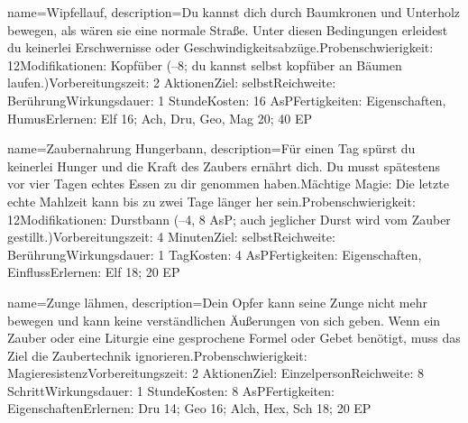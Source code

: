 {
    name={Wipfellauf},
    description={Du kannst dich durch Baumkronen und Unterholz bewegen, als wären sie eine normale Straße. Unter diesen Bedingungen erleidest du keinerlei Erschwernisse oder Geschwindigkeitsabzüge.\newline Probenschwierigkeit: 12\newline Modifikationen: Kopfüber (–8; du kannst selbst kopfüber an Bäumen laufen.)\newline Vorbereitungszeit: 2 Aktionen\newline Ziel: selbst\newline Reichweite: Berührung\newline Wirkungsdauer: 1 Stunde\newline Kosten: 16 AsP\newline Fertigkeiten: Eigenschaften, Humus\newline Erlernen: Elf 16; Ach, Dru, Geo, Mag 20; 40 EP}
}


{
    name={Zaubernahrung Hungerbann},
    description={Für einen Tag spürst du keinerlei Hunger und die Kraft des Zaubers ernährt dich. Du musst spätestens vor vier Tagen echtes Essen zu dir genommen haben.\newline Mächtige Magie: Die letzte echte Mahlzeit kann bis zu zwei Tage länger her sein.\newline Probenschwierigkeit: 12\newline Modifikationen: Durstbann (–4, 8 AsP; auch jeglicher Durst wird vom Zauber gestillt.)\newline Vorbereitungszeit: 4 Minuten\newline Ziel: selbst\newline Reichweite: Berührung\newline Wirkungsdauer: 1 Tag\newline Kosten: 4 AsP\newline Fertigkeiten: Eigenschaften, Einfluss\newline Erlernen: Elf 18; 20 EP}
}


{
    name={Zunge lähmen},
    description={Dein Opfer kann seine Zunge nicht mehr bewegen und kann keine verständlichen Äußerungen von sich geben. Wenn ein Zauber oder eine Liturgie eine gesprochene Formel oder Gebet benötigt, muss das Ziel die Zaubertechnik ignorieren.\newline Probenschwierigkeit: Magieresistenz\newline Vorbereitungszeit: 2 Aktionen\newline Ziel: Einzelperson\newline Reichweite: 8 Schritt\newline Wirkungsdauer: 1 Stunde\newline Kosten: 8 AsP\newline Fertigkeiten: Eigenschaften\newline Erlernen: Dru 14; Geo 16; Alch, Hex, Sch 18; 20 EP}
}


